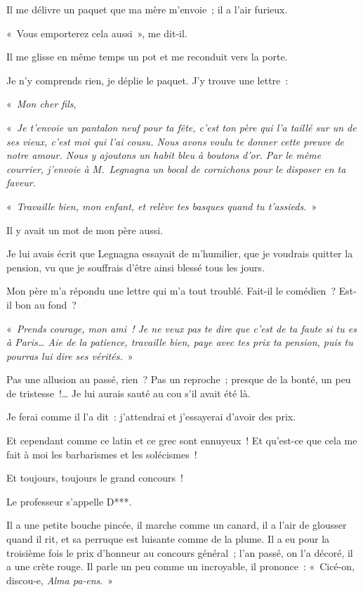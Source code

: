 \documentclass[french,twoside]{book} %
\begin{document}
Il me délivre un paquet que ma mère m’envoie ; il a l’air furieux.\par
« Vous emporterez cela aussi », me dit-il.\par
Il me glisse en même temps un pot et me reconduit vers la porte.\par
Je n’y comprends rien, je déplie le paquet. J’y trouve une lettre :\par
\bigbreak
\noindent « \emph{Mon cher fils},\par
« \emph{Je t’envoie un pantalon neuf pour ta fête, c’est ton père qui l’a taillé sur un de ses vieux, c’est moi qui l’ai cousu. Nous avons voulu te donner cette preuve de notre amour. Nous y ajoutons un habit bleu à boutons d’or. Par le même courrier, j’envoie à M. Legnagna un bocal de cornichons pour le disposer en ta faveur.}\par
« \emph{Travaille bien, mon enfant, et relève tes basques quand tu t’assieds.} »\par
\bigbreak
\noindent Il y avait un mot de mon père aussi.\par
Je lui avais écrit que Legnagna essayait de m’humilier, que je voudrais quitter la pension, vu que je souffrais d’être ainsi blessé tous les jours.\par
Mon père m’a répondu une lettre qui m’a tout troublé. Fait-il le comédien ? Est-il bon au fond ?\par
\bigbreak
\noindent « \emph{Prends courage, mon ami ! Je ne veux pas te dire que c’est de ta faute si tu es à Paris… Aie de la patience, travaille bien, paye avec tes prix ta pension, puis tu pourras lui dire ses vérités.} »\par
\bigbreak
\noindent Pas une allusion au passé, rien ? Pas un reproche ; presque de la bonté, un peu de tristesse !… Je lui aurais sauté au cou s’il avait été là.\par
Je ferai comme il l’a dit : j’attendrai et j’essayerai d’avoir des prix.\par
Et cependant comme ce latin et ce grec sont ennuyeux ! Et qu’est-ce que cela me fait à moi les barbarismes et les solécismes !\par
Et toujours, toujours le grand concours !\par
Le professeur s’appelle D***.\par
Il a une petite bouche pincée, il marche comme un canard, il a l’air de glousser quand il rit, et sa perruque est luisante comme de la plume. Il a eu pour la troisième fois le prix d’honneur au concours général ; l’an passé, on l’a décoré, il a une crête rouge. Il parle un peu comme un incroyable, il prononce : « Cicé-on, discou-e, \emph{Alma pa-ens}. »\par
\end{document}
